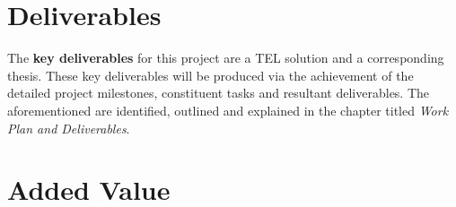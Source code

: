 \section{Deliverables}
\label{sec:sec01}

The \textbf{key deliverables} for this project are a TEL solution and a corresponding thesis. These key deliverables will be produced via the achievement of the detailed project milestones, constituent tasks and resultant deliverables. The aforementioned are identified, outlined and explained in the chapter titled \textit{Work Plan and Deliverables}.

\newpage
\section{Added Value}
\label{sec:sec01}

